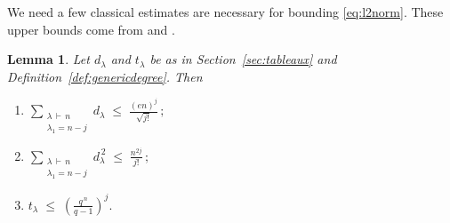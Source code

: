 \documentclass[11pt]{article}
\theoremstyle{plain}  %
\newtheorem{lemma}[theorem]{Lemma}
\begin{document}
We need a few classical estimates are necessary for bounding \eqref{eq:l2norm}. These upper bounds come from \cite{DiaconisRam2000} and \cite{Diaconis1981}.


\begin{lemma}\label{lem:bounds}
Let $d_\lambda$ and
$t_\lambda$ be as in Section~\ref{sec:tableaux} and
Definition~\ref{def:genericdegree}. Then
\begin{enumerate}
\item $\displaystyle
  \sum_{\substack{\lambda \,\vdash\, n \\ \lambda_1=n-j}} d_\lambda
  \;\le\; \frac{(en)^{j}}{\sqrt{j!}}\,;$
\item $\displaystyle
  \sum_{\substack{\lambda \,\vdash\, n \\ \lambda_1=n-j }} d_\lambda^{\,2}
  \;\le\; \frac{n^{2j}}{j!}\,;$
\item $\displaystyle
  t_\lambda \;\le\; \left(\frac{q^{\,n}}{q-1}\right)^{j} .$
\end{enumerate}
\end{lemma}
\end{document}
